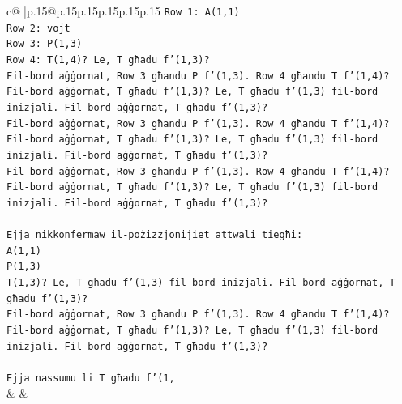 \documentclass{article}
\begin{document}
{\begin{supertabular}{c@{$\;$}|p{.15\linewidth}@{}p{.15\linewidth}p{.15\linewidth}p{.15\linewidth}p{.15\linewidth}p{.15\linewidth}}
{{{\texttt{Row 1: A(1,1)} \\
\texttt{Row 2: vojt} \\
\texttt{Row 3: P(1,3)} \\
\texttt{Row 4: T(1,4)? Le, T għadu f'(1,3)?} \\
\texttt{Fil{-}bord aġġornat, Row 3 għandu P f'(1,3). Row 4 għandu T f'(1,4)?} \\
\texttt{Fil{-}bord aġġornat, T għadu f'(1,3)? Le, T għadu f'(1,3) fil{-}bord inizjali. Fil{-}bord aġġornat, T għadu f'(1,3)?} \\
\texttt{Fil{-}bord aġġornat, Row 3 għandu P f'(1,3). Row 4 għandu T f'(1,4)?} \\
\texttt{Fil{-}bord aġġornat, T għadu f'(1,3)? Le, T għadu f'(1,3) fil{-}bord inizjali. Fil{-}bord aġġornat, T għadu f'(1,3)?} \\
\texttt{Fil{-}bord aġġornat, Row 3 għandu P f'(1,3). Row 4 għandu T f'(1,4)?} \\
\texttt{Fil{-}bord aġġornat, T għadu f'(1,3)? Le, T għadu f'(1,3) fil{-}bord inizjali. Fil{-}bord aġġornat, T għadu f'(1,3)?} \\
\\ 
\texttt{Ejja nikkonfermaw il{-}pożizzjonijiet attwali tiegħi:} \\
\texttt{A(1,1)} \\
\texttt{P(1,3)} \\
\texttt{T(1,3)? Le, T għadu f'(1,3) fil{-}bord inizjali. Fil{-}bord aġġornat, T għadu f'(1,3)?} \\
\texttt{Fil{-}bord aġġornat, Row 3 għandu P f'(1,3). Row 4 għandu T f'(1,4)?} \\
\texttt{Fil{-}bord aġġornat, T għadu f'(1,3)? Le, T għadu f'(1,3) fil{-}bord inizjali. Fil{-}bord aġġornat, T għadu f'(1,3)?} \\
\\ 
\texttt{Ejja nassumu li T għadu f'(1,} \\
            }
        }
    }
    & & \\ \\


\end{supertabular}}
\end{document}
